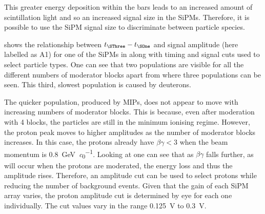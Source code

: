 This greater energy deposition within the bars leads to an increased amount of scintillation light and so an increased signal size in the SiPMs.
Therefore, it is possible to use the SiPM signal size to discriminate between particle species.

 shows the relationship between $t_{\SThree} - t_{\SOne}$ and signal amplitude (here labelled as A1) for one of the SiPMs in \SThree along with timing and signal cuts used to select particle types.
One can see that two populations are visible for all the different numbers of moderator blocks apart from  where three populations can be seen.
This third, slowest population is caused by deuterons.

The quicker population, produced by MIPs, does not appear to move with increasing numbers of moderator blocks.
This is because, even after moderation with 4 blocks, the particles are still in the minimum ionising regime.
However, the proton peak moves to higher amplitudes as the number of moderator blocks increases.
In this case, the protons already have $\beta\gamma < 3$ when the beam momentum is \SI{0.8}{\giga\electronvolt\per\clight}.
Looking at  one can see that as $\beta\gamma$ falls further, as will occur when the protons are moderated, the energy loss and thus the amplitude rises.
Therefore, an amplitude cut can be used to select protons while reducing the number of background events.
Given that the gain of each SiPM array varies, the proton amplitude cut is determined by eye for each one individually.
The cut values vary in the range \SI{0.125}{\volt} to \SI{0.3}{\volt}.

